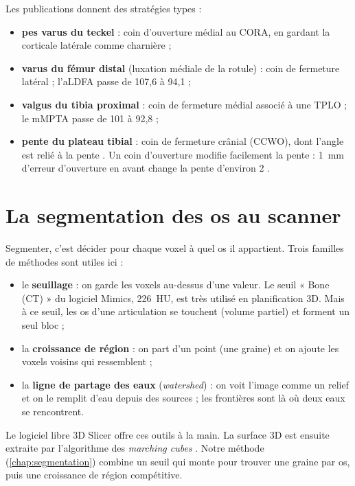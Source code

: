 Les publications donnent des stratégies types :
\begin{itemize}
  \item \textbf{pes varus du teckel} : coin d'ouverture médial au CORA, en gardant la corticale latérale comme
  charnière \cite{petazzoni2012} ;
  \item \textbf{varus du fémur distal} (luxation médiale de la rotule) : coin de fermeture latéral ; l'aLDFA passe de
  107,6 à 94,1\degre{} \cite{brower2017} ;
  \item \textbf{valgus du tibia proximal} : coin de fermeture médial associé à une TPLO ; le mMPTA passe de 101 à
  92,8\degre{} \cite{vezzoni2020} ;
  \item \textbf{pente du plateau tibial} : coin de fermeture crânial (CCWO), dont l'angle est relié à la pente
  \cite{guenego2021,guenego2025}. Un coin d'ouverture modifie facilement la pente : 1~mm d'erreur d'ouverture en avant
  change la pente d'environ 2\degre{} \cite{noyes2005,ducat2012}.
\end{itemize}

\section{La segmentation des os au scanner}
\label{sec:etat-segmentation}

Segmenter, c'est décider pour chaque voxel à quel os il appartient. Trois familles de méthodes sont utiles ici :
\begin{itemize}
  \item le \textbf{seuillage} : on garde les voxels au-dessus d'une valeur. Le seuil « Bone (CT) » du logiciel
  Mimics, 226~HU, est très utilisé en planification 3D. Mais à ce seuil, les os d'une articulation se touchent (volume
  partiel) et forment un seul bloc ;
  \item la \textbf{croissance de région} : on part d'un point (une graine) et on ajoute les voxels voisins qui
  ressemblent ;
  \item la \textbf{ligne de partage des eaux} (\emph{watershed}) \cite{meyer1994} : on voit l'image comme un relief
  et on le remplit d'eau depuis des sources ; les frontières sont là où deux eaux se rencontrent.
\end{itemize}
Le logiciel libre 3D Slicer \cite{fedorov2012} offre ces outils à la main. La surface 3D est ensuite extraite par
l'algorithme des \emph{marching cubes} \cite{lorensen1987}. Notre méthode (\cref{chap:segmentation}) combine un seuil
qui monte pour trouver une graine par os, puis une croissance de région compétitive.

